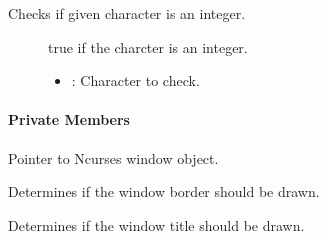 \documentclass[letterpaper,10pt,english]{sphinxmanual}
\begin{document}
\begin{fulllineitems}
\begin{fulllineitems}
Checks if given character is an integer. \begin{description}
\item[{}] \leavevmode
true if the charcter is an integer. 

\item[{}] \leavevmode\begin{itemize}
\item {} 
: Character to check. 

\end{itemize}

\end{description}


\end{fulllineitems}

\paragraph{Private Members}

\begin{fulllineitems}
\label{\detokenize{index:_CPPv2N7ostendo6Window14window_pointerE}}%
\pysigstartmultiline
{}%
\pysigstopmultiline
Pointer to Ncurses window object. 

\end{fulllineitems}


\begin{fulllineitems}
\label{\detokenize{index:_CPPv2N7ostendo6Window13window_borderE}}%
\pysigstartmultiline
{}%
\pysigstopmultiline
Determines if the window border should be drawn. 

\end{fulllineitems}


\begin{fulllineitems}
\label{\detokenize{index:_CPPv2N7ostendo6Window12window_titleE}}%
\pysigstartmultiline
{}%
\pysigstopmultiline
Determines if the window title should be drawn. 


\end{fulllineitems}
\end{fulllineitems}
\end{document}
